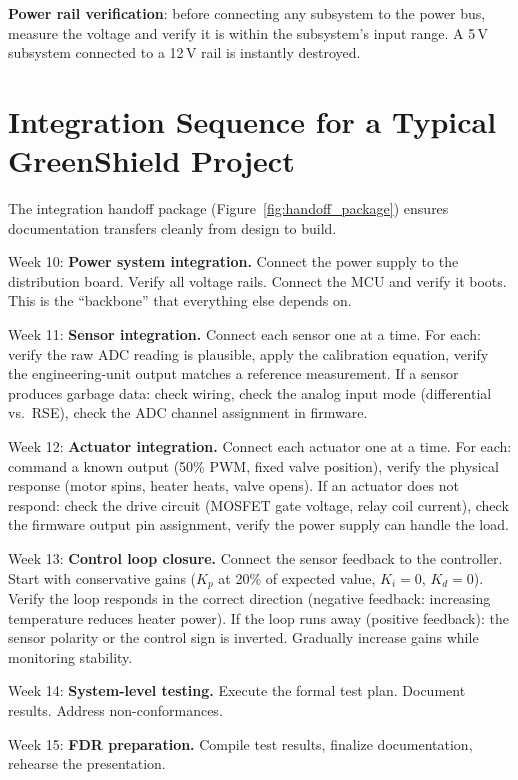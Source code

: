 \textbf{Power rail verification}: before connecting any subsystem to the power bus, measure the voltage and verify it is within the subsystem's input range. A 5\,V subsystem connected to a 12\,V rail is instantly destroyed.

\section{Integration Sequence for a Typical GreenShield Project}



The integration handoff package (Figure~\ref{fig:handoff_package}) ensures documentation transfers cleanly from design to build.

Week 10: \textbf{Power system integration.} Connect the power supply to the distribution board. Verify all voltage rails. Connect the MCU and verify it boots. This is the ``backbone'' that everything else depends on.

Week 11: \textbf{Sensor integration.} Connect each sensor one at a time. For each: verify the raw ADC reading is plausible, apply the calibration equation, verify the engineering-unit output matches a reference measurement. If a sensor produces garbage data: check wiring, check the analog input mode (differential vs.\ RSE), check the ADC channel assignment in firmware.

Week 12: \textbf{Actuator integration.} Connect each actuator one at a time. For each: command a known output (50\% PWM, fixed valve position), verify the physical response (motor spins, heater heats, valve opens). If an actuator does not respond: check the drive circuit (MOSFET gate voltage, relay coil current), check the firmware output pin assignment, verify the power supply can handle the load.

Week 13: \textbf{Control loop closure.} Connect the sensor feedback to the controller. Start with conservative gains ($K_p$ at 20\% of expected value, $K_i = 0$, $K_d = 0$). Verify the loop responds in the correct direction (negative feedback: increasing temperature reduces heater power). If the loop runs away (positive feedback): the sensor polarity or the control sign is inverted. Gradually increase gains while monitoring stability.

Week 14: \textbf{System-level testing.} Execute the formal test plan. Document results. Address non-conformances.

Week 15: \textbf{FDR preparation.} Compile test results, finalize documentation, rehearse the presentation.
